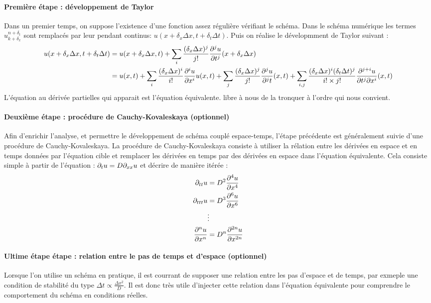 \paragraph{Première étape : développement de Taylor}
Dans un premier temps, on suppose l'existence d'une fonction assez régulière vérifiant le schéma.
Dans le schéma numérique les termes $u^{n+\delta_t}_{k+\delta_x}$ sont remplacés par leur pendant
continus: $u(x+\delta_x \Delta x, t + \delta_t \Delta t)$. Puis on réalise le dévelopmment de Taylor suivant : 
\begin{align}
    u(x+\delta_x \Delta x, t + \delta_t \Delta t) &= u(x+\delta_x \Delta x , t) 
        + \sum_{i} \frac{(\delta_x \Delta x )^j}{j!} \frac{\partial^j u}{\partial t^j }(x+\delta_x \Delta x)\\\notag
    &= u(x , t) 
        + \sum_i  \frac{(\delta_x \Delta x)^i}{i!} 
                \frac{\partial^i u}{\partial x^i}u(x,t)
        + \sum_j  \frac{(\delta_x \Delta x )^j}{j!} 
                \frac{\partial^j u}{\partial^j t}(x,t)
        + \sum_{i,j}  \frac{(\delta_x \Delta x )^{i}(\delta_t \Delta t )^{j}}  {i! \times j!}
                \frac{\partial^{j+i} u}     {\partial t^j \partial x^i}(x,t)
\end{align}
L'équation au dérivée partielles qui apparait est l'équation équivalente. libre à nous de la tronquer à l'ordre qui nous convient.
\paragraph{Deuxième étape : procédure de Cauchy-Kovaleskaya (optionnel)}
Afin d'enrichir l'analyse, et permettre le développement de schéma couplé espace-temps, l'étape précédente est généralement suivie d'une procédure de Cauchy-Kovaleskaya.
La procédure de Cauchy-Kovaleskaya consiste à utiliser la rélation entre les dérivées en espace et en temps données par l'équation cible et remplacer les dérivées en temps par des dérivées en espace dans l'équation équivalente. 
Cela consiste simple à partir de l'équation : $\partial_t u = D \partial_{xx} u$ et décrire de manière itérée : 
\begin{align}
    \partial_{tt} u &= D^2 \frac{\partial^4 u }{\partial x^4}\\\notag
    \partial_{ttt} u&= D^3 \frac{\partial^6 u }{\partial x^6}\\\notag
    &\vdots\\\notag
    \frac{\partial^n u}{\partial x^n} &=D^n \frac{\partial^{2n} u}{\partial x^{2n}}
\end{align}
\paragraph{Ultime étape étape : relation entre le pas de temps et d'espace (optionnel)}
Lorsque l'on utilise un schéma en pratique, il est courrant de supposer une relation entre les pas d'espace et de temps, par exmeple une condition de stabilité du type 
$\Delta t \propto \frac{\Delta x^2}{D}$.
Il est donc très utile d'injecter cette relation dans l'équation équivalente pour comprendre le comportement du schéma en conditions réelles.